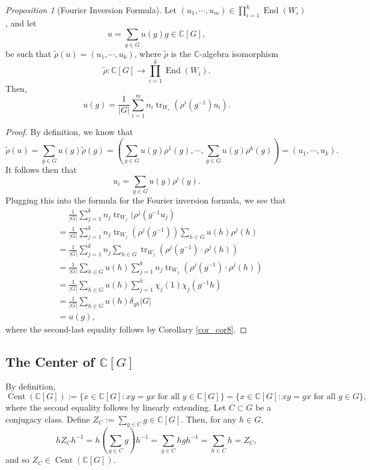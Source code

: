 \documentclass[a4paper]{report}
\theoremstyle{definition}
\theoremstyle{remark}
\theoremstyle{proposition}
\newtheorem{proposition}{Proposition}
\theoremstyle{conjecture}
\theoremstyle{lemma}
\theoremstyle{corollary}
\theoremstyle{exercise}
\theoremstyle{example}
\newcommand{\C}{\mathbb{C}}
\newcommand{\on}{\operatorname}
\begin{document}
\begin{proposition}[Fourier Inversion Formula]
    Let $(u_1,\cdots,u_m) \in \prod_{i=1}^k\on{End}(W_i)$, and let 
    $$u = \sum_{g \in G} u(g)g \in \C[G],$$ be such that 
    $\widetilde{\rho}(u) = (u_1,\cdots,u_k)$, where $\widetilde{\rho}$ 
    is the $\C$-algebra isomorphism 
    $$\widetilde{\rho} : \C[G] \longrightarrow \prod_{i=1}^k \on{End}(W_i).$$
    Then,
    $$u(g) = \frac{1}{\vert G \vert} \sum_{i=1}^m n_i \on{tr}_{W_i}\left(\rho^i(g^{-1})u_i\right).$$
\end{proposition}

\begin{proof}
    By definition, we know that 
    $$\widetilde{\rho}(u) = \sum_{g \in G} u(g) \widetilde{\rho}(g) = \left(\sum_{g\in G} u(g) \rho^1(g), \cdots, \sum_{g \in G}u(g)\rho^k(g)\right) = (u_1,\cdots,u_k).$$
    It follows then that 
    $$u_i = \sum_{g \in G} u(g) \rho^i(g).$$
    Plugging this into the formula for the 
    Fourier inversion formula, we see that 
    \begin{align*}
        &\,\,\,\,\,\,\,\,\frac{1}{\vert G\vert} \sum_{j=1}^k n_j \on{tr}_{W_j} (\rho^j(g^{-1}u_j)\\
        &= \frac{1}{\vert G\vert} \sum_{j=1}^k n_j \on{tr}_{W_j} (\rho^j(g^{-1}))\sum_{h\in G} u(h)\rho^j(h)\\
        &= \frac{1}{\vert G\vert} \sum_{j=1}^k n_j\sum_{h\in G} \on{tr}_{W_j}(\rho^j(g^{-1})\cdot \rho^j(h))\\
        &= \frac{1}{\vert G\vert} \sum_{h \in G} u(h) \sum_{j=1}^k n_j \on{tr}_{W_j}(\rho^j(g^{-1})\cdot\rho^j(h))\\
        &= \frac{1}{\vert G\vert} \sum_{h \in G} u(h) \sum_{j=1}^k \chi_j(1)\chi_j(g^{-1}h)\\
        &= \frac{1}{\vert G\vert}\sum_{h\in G} u(h) \delta_{gh}\vert G\vert\\
        &=u(g),
    \end{align*}
    where the second-last equality follows by Corollary \ref{cor_cor8}.
\end{proof}

\subsection{The Center of $\C[G]$}

By definition, $$\on{Cent}(\C[G]) := \lbrace x \in \C[G] : \text{$xy=yx$ for all $y\in \C[G]$}\rbrace = \lbrace x \in \C[G] : \text{$xg = gx$ for all $g\in G$}\rbrace,$$
where the second equality follows by linearly extending.
Let $C\subset G$ be a conjugacy class. Define 
$Z_C := \sum_{g \in C}g \in \C[G]$.
Then, for any $h\in G$, 
$$hZ_Ch^{-1} = h\left(\sum_{g \in C} g\right)h^{-1} = \sum_{g\in C} hgh^{-1} = \sum_{h\in C} h = Z_C,$$
and so $Z_C \in \on{Cent}(\C[G])$.
\end{document}
